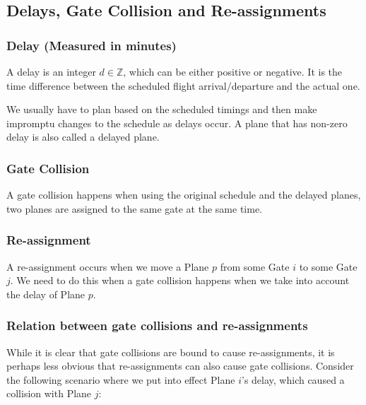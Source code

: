 \documentclass[12pt, a4paper]{report}
\begin{document}
\subsection{Delays, Gate Collision and Re-assignments}
\subsubsection{Delay (Measured in minutes)}
A delay is an integer $d \in \mathbb{Z}$, which can be either positive or negative. It is the time difference between the scheduled flight arrival/departure and the actual one.

We usually have to plan based on the scheduled timings and then make impromptu changes to the schedule as delays occur. A plane that has non-zero delay is also called a delayed plane.

\subsubsection{Gate Collision}
A gate collision happens when using the original schedule and the delayed planes, two planes are assigned to the same gate at the same time.

\subsubsection{Re-assignment}
A re-assignment occurs when we move a Plane $p$ from some Gate $i$ to some Gate $j$. We need to do this when a gate collision happens when we take into account the delay of Plane $p$.

\subsubsection{Relation between gate collisions and re-assignments}
While it is clear that gate collisions are bound to cause re-assignments, it is perhaps less obvious that re-assignments can also cause gate collisions. Consider the following scenario where we put into effect Plane $i$'s delay, which caused a collision with Plane $j$:
\end{document}
